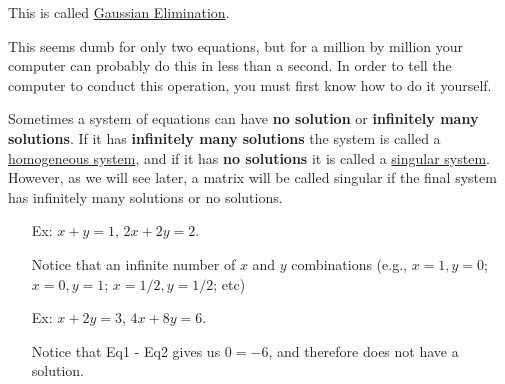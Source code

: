 \documentclass[reqno]{amsart}
\theoremstyle{definition}
\begin{document}
This is called \underline{Gaussian Elimination}.

This seems dumb for only two equations, but for a million by million your computer can probably do
this in less than a second.  In order to tell the computer to conduct this operation, you must first
know how to do it yourself.

Sometimes a system of equations can have \textbf{no solution} or \textbf{infinitely many solutions}.
If it has \textbf{infinitely many solutions} the system is called a \underline{homogeneous system}, and if it has 
\textbf{no solutions} it is called a \underline{singular system}.  However, as we will see later, a matrix
will be called singular if the final system has infinitely many solutions or no solutions.

\begin{itemize}

\item[Ex:  ]  $x + y = 1$, $2x + 2y = 2$.

Notice that an infinite number of $x$ and $y$ combinations (e.g., $x = 1, y = 0$; $x = 0, y = 1$; $x = 1/2, y = 1/2$; etc)

\item[Ex:  ]  $x + 2y = 3$, $4x + 8y = 6$.

Notice that Eq1 - Eq2 gives us $0 = -6$, and therefore does not have a solution.

\end{itemize}
\end{document}
